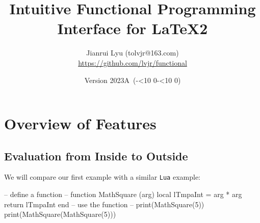 \documentclass[oneside]{book}
\newcommand*{\myversion}{2023A}
\newcommand*{\mydate}{Version \myversion\ (\the\year-\mylpad\month-\mylpad\day)}
\newcommand*{\mylpad}[1]{\ifnum#1<10 0\the#1\else\the#1\fi}
\begin{document}
\title{\sffamily Intuitive \textcolor{green3}{Functional} Programming Interface for LaTeX2}
\author{Jianrui Lyu (tolvjr@163.com)\\\url{https://github.com/lvjr/functional}}
\date{\mydate\vspace{1cm}\\\myabstract\vspace{10cm}}

\newcommand\myabstract{\parbox{\linewidth}{\hrule\vspace{0.8em}\large
This package provides an intuitive functional programming interface for LaTeX2,
which is an alternative choice to \textsf{expl3} or LuaTeX,
if you want to do programming in LaTeX.
\par\vspace{0.5em}
Although there are functions in LaTeX3 programming layer (\textsf{expl3}),
the evaluation of them is from outside to inside.
With this package, the evaluation of functions is from inside to outside,
which is the same as other programming languages such as \texttt{Lua}.
In this way, it is rather easy to debug code too.
\par\vspace{0.5em}
Note that many paragraphs in this manual are copied from the documentation of \textsf{expl3}.
\par\vspace{0.8em}\hrule}}

{\let\newpage\relax\vspace{-4cm}\maketitle}

\tableofcontents

\chapter{Overview of Features}

\section{Evaluation from Inside to Outside}

We will compare our first example with a similar \verb!Lua! example:

\begin{minipage}{0.55\textwidth}
\begin{codehigh}
\IgnoreSpacesOn
\prgNewFunction {} {
  \intSet {}
  \prgReturn {\expValue \lTmpaInt}
}
\IgnoreSpacesOff
{}
\end{codehigh}
\end{minipage}%
\begin{minipage}{0.45\textwidth}
\begin{code}
-- define a function --
function MathSquare (arg)
  local lTmpaInt = arg * arg
  return lTmpaInt
end
-- use the function --
print(MathSquare(5))
print(MathSquare(MathSquare(5)))
\end{code}
\end{minipage}
\end{document}
